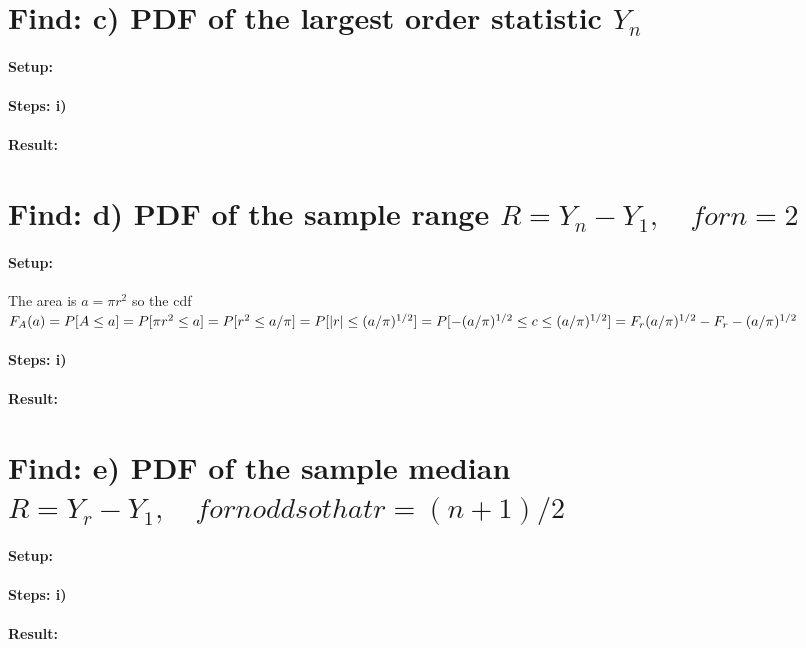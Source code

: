 \section*{Find: c) PDF of the largest order statistic ${Y}_{n}$ }

\paragraph{Setup:} 

\paragraph{Steps: i)} 


\paragraph{Result:} 

\section*{Find: d) PDF of the sample range $R={Y}_{n}-{Y}_{1},\quad for n=2$ }

\paragraph{Setup:} The area is $a=\pi{r}^{2}$ so the cdf ${ F }_{ A }(a)=P[A\le a]=P[\pi{r}^{2}\le a]=P[{r}^{2}\le a/\pi]\\=P[\left|r \right| \le (a/\pi)^{1/2} ]=P[-(a/\pi)^{1/2}\le c \le(a/\pi)^{1/2}]= {F}_{r}(a/\pi)^{1/2}-{F}_{r}-(a/\pi)^{1/2}$

\paragraph{Steps: i)}


\paragraph{Result:} 

\section*{Find: e) PDF of the sample median $R={Y}_{r}-{Y}_{1},\quad for n odd so that r=(n+1)/2$ }

\paragraph{Setup:} 

\paragraph{Steps: i)} 


\paragraph{Result:} 